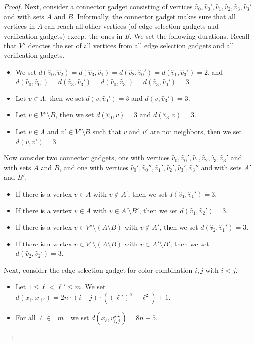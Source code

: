 \documentclass[a4paper,UKenglish,cleveref, autoref, thm-restate]{lipics-v2021}
\begin{document}
\begin{proof}
Next, consider a connector gadget consisting of vertices $\hat{v}_0,\hat{v}_0',\hat{v}_1,\hat{v}_2,\hat{v}_3,\hat{v}_3'$ and with sets $A$ and $B$. Informally, the connector gadget makes sure that all vertices in $A$ can reach all other vertices (of edge selection gadgets and verification gadgets) except the ones in $B$. We set the following durations. Recall that $V^\star$ denotes the set of all vertices from all edge selection gadgets and all verification gadgets.
\begin{itemize}
    \item We set $d(\hat{v}_0,\hat{v}_2)=d(\hat{v}_3,\hat{v}_1)=d(\hat{v}_2,\hat{v}_0')=d(\hat{v}_1,\hat{v}_3')=2$, and $d(\hat{v}_0,\hat{v}_0')=d(\hat{v}_3,\hat{v}_3')=d(\hat{v}_0,\hat{v}_3')=d(\hat{v}_3,\hat{v}_0')=3$.
    \item Let $v\in A$, then we set $d(v,\hat{v}_0')=3$ and $d(v,\hat{v}_3')=3$.
    \item Let $v\in V^\star\setminus B$, then we set $d(\hat{v}_0,v)=3$ and $d(\hat{v}_3,v)=3$.
    \item Let $v\in A$ and $v'\in V^\star\setminus B$ such that $v$ and $v'$ are not neighbors, then we set $d(v,v')=3$.
\end{itemize}
Now consider two connector gadgets, one with vertices $\hat{v}_0,\hat{v}_0',\hat{v}_1,\hat{v}_2,\hat{v}_3,\hat{v}_3'$ and with sets $A$ and $B$, and one with vertices $\hat{v}_0',\hat{v}_0'',\hat{v}_1',\hat{v}_2',\hat{v}_3',\hat{v}_3''$ and with sets $A'$ and $B'$.
\begin{itemize}
    \item If there is a vertex $v\in A$ with $v\notin A'$, then we set $d(\hat{v}_1,\hat{v}_1')=3$.
    \item If there is a vertex $v\in A$ with $v\in A'\setminus B'$, then we set $d(\hat{v}_1,\hat{v}_2')=3$.
    \item If there is a vertex $v\in V^\star\setminus (A\setminus B)$ with $v\notin A'$, then we set $d(\hat{v}_2,\hat{v}_1')=3$.    
    \item If there is a vertex $v\in V^\star\setminus (A\setminus B)$ with $v\in A'\setminus B'$, then we set $d(\hat{v}_2,\hat{v}_2')=3$.
\end{itemize}

Next, consider the edge selection gadget for color combination $i,j$ with $i<j$.
\begin{itemize}
    \item Let $1\le \ell<\ell'\le m$. We set $d(x_\ell,x_{\ell'})=2n\cdot (i+j)\cdot((\ell')^2-\ell^2)+1$.
    \item For all $\ell\in[m]$ we set $d(x_\ell,v_{i,j}^{\star\star})=8n+5$.
\end{itemize}


\end{proof}
\end{document}
